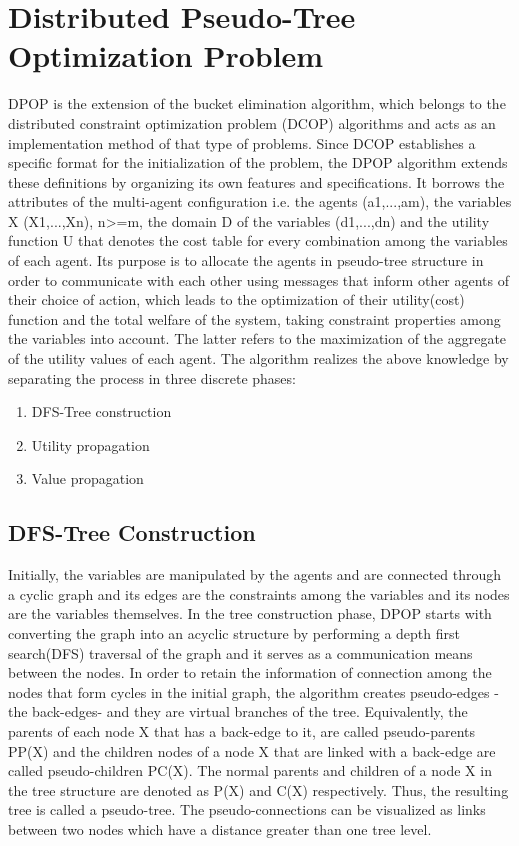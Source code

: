 \documentclass[11pt,a4paper,onecolumn]{article}
\begin{document}
	
	\section{Distributed Pseudo-Tree Optimization Problem}
	DPOP is the extension of the bucket elimination algorithm, which belongs to the distributed constraint optimization problem (DCOP) algorithms and acts as an implementation method of that type of problems. Since DCOP establishes a specific format for the initialization of the problem, the DPOP algorithm extends these definitions by organizing its own features and specifications. It borrows the attributes of the multi-agent configuration i.e. the agents (a1,...,am), the variables X (X1,...,Xn), n>=m, the domain D of the variables (d1,...,dn) and the utility function U that denotes the cost table for every combination among the variables of each agent.
	Its purpose is to allocate the agents in pseudo-tree structure in order to communicate with each other using messages that inform other agents of their choice of action, which leads to the optimization of their utility(cost) function and the total welfare of the system, taking constraint properties among the variables into account. The latter refers to the maximization of the aggregate of the utility values of each agent.
	The algorithm realizes the above knowledge by separating the process in three discrete phases:
	
	\begin{enumerate}
		\item DFS-Tree construction
		\item Utility propagation
		\item Value propagation
	\end{enumerate}
	

	
	\subsection{DFS-Tree Construction}
	
	Initially, the variables are manipulated by the agents and are connected through a cyclic graph and its edges are the constraints among the variables and its nodes are the variables themselves. In the tree construction phase, DPOP starts with converting the graph into an acyclic structure by performing a depth first search(DFS) traversal of the graph and it serves as a communication means between the nodes. In order to retain the information of connection among the nodes that form cycles in the initial graph, the algorithm creates pseudo-edges - the back-edges- and they are virtual branches of the tree. Equivalently, the parents of each node X that has a back-edge to it, are called pseudo-parents PP(X) and the children nodes of a node X that are linked with a back-edge are called pseudo-children PC(X). The normal parents and children of a node X in the tree structure are denoted as P(X) and C(X) respectively. Thus, the resulting tree is called a pseudo-tree. The pseudo-connections can be visualized as links between two nodes which have a distance greater than one tree level.
		
\end{document}

